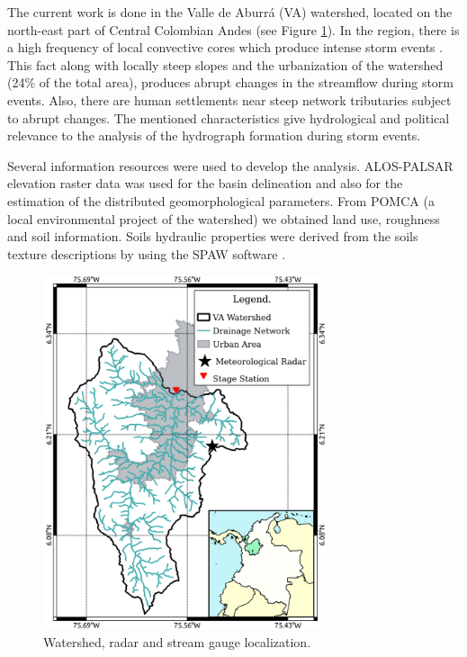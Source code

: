 \documentclass[preprint,12pt]{elsarticle}
\begin{document}
The current work is done in the Valle de Aburrá (VA) watershed, located on the north-east part of Central Colombian Andes (see Figure \ref{fig:localization}).  In the region, there is a high frequency of local convective cores which produce intense storm events \citep{Zuluaga2015}. This fact along with locally steep slopes and the urbanization of the watershed (24\% of the total area), produces abrupt changes in the streamflow during storm events. Also, there are human settlements near steep network tributaries subject to abrupt changes.  The mentioned characteristics give hydrological and political relevance to the analysis of the hydrograph formation during storm events. 

Several information resources were used to develop the analysis.  ALOS-PALSAR elevation raster data \citep{ALOS} was used for the basin delineation and also for the estimation of the distributed geomorphological parameters.  From POMCA (a local environmental project of the watershed) we obtained land use, roughness and soil information. Soils hydraulic properties were derived from the soils texture descriptions by using the SPAW software \citep{Saxton2006}.

\begin{figure}[t]
    \centering
    \includegraphics[width=8.3cm]{Figuras/layout_aula3.png}
    \caption{Watershed, radar and stream gauge localization.}
    \label{fig:localization}
\end{figure}
\end{document}
